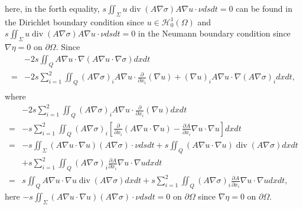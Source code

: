 \documentclass[9pt,reqno]{amsart}
\theoremstyle{plain}
\numberwithin{equation}{section}
\numberwithin{theorem}{section}
\def\Om{\Omega}
\DeclareMathOperator*{\Div}{\mathrm{div}}
\def\Om{\Omega}
\begin{document}
	here, in the forth equality, $s \iint_\Sigma u \Div(A \nabla \sigma )A \nabla u \cdot \nu dsdt=0$ can be found in the Dirichlet boundary condition since $u \in \mathcal{H}_0^1(\Om)$ and $s \iint_\Sigma u \Div(A \nabla \sigma )A \nabla u \cdot \nu dsdt=0$ in the Neumann boundary condition since $\nabla \eta=0$ on $\partial \Om$.
	Since
	\begin{equation*}
		\begin{split}
			&-2s \iint_{Q} A \nabla u \cdot \nabla (A\nabla u \cdot \nabla \sigma) dx dt\\
			=&-2s \sum_{i=1}^{2} \iint_{Q} (A\nabla \sigma)_i A \nabla u \cdot \frac{\partial}{\partial x_i}(\nabla u) + (\nabla u)_i A \nabla u \cdot \nabla (A \nabla \sigma)_i dx dt,\\
		\end{split}
	\end{equation*}
	where
	\begin{equation*}
		\begin{split}
			&-2s \sum_{i=1}^{2} \iint_{Q} (A\nabla \sigma)_i A \nabla u \cdot \frac{\partial}{\partial x_i}(\nabla u) dx dt\\%
			=& -s \sum_{i=1}^{2}\iint_{Q} (A\nabla \sigma)_i \left[ \frac{\partial}{\partial x_i} (A \nabla u \cdot \nabla u) - \frac{\partial A}{\partial x_i} \nabla u \cdot \nabla u \right] dx dt\\%
			=&-s \iint_\Sigma (A \nabla u \cdot \nabla u)(A\nabla \sigma) \cdot \nu dsdt + s\iint_{Q} (A \nabla u \cdot \nabla u ) \Div(A\nabla \sigma) dx dt\\
			&+s \sum_{i=1}^{2} \iint_{Q} (A\nabla \sigma)_i \frac{\partial A}{\partial x_i} \nabla u \cdot \nabla u dx dt\\%
			=&  s \iint_{Q} A\nabla u \cdot \nabla u \Div(A\nabla \sigma) dx dt
			+ s  \sum_{i=1}^{2}\iint_{Q} (A\nabla \sigma)_i \frac{\partial A}{\partial x_i} \nabla u \cdot \nabla u dx dt, 
		\end{split}
	\end{equation*}
	here $-s \iint_\Sigma (A \nabla u \cdot \nabla u)(A\nabla \sigma) \cdot \nu dsdt=0$ on $\partial \Om$ since $\nabla \eta=0$ on $\partial \Om$.
	
\end{document}
